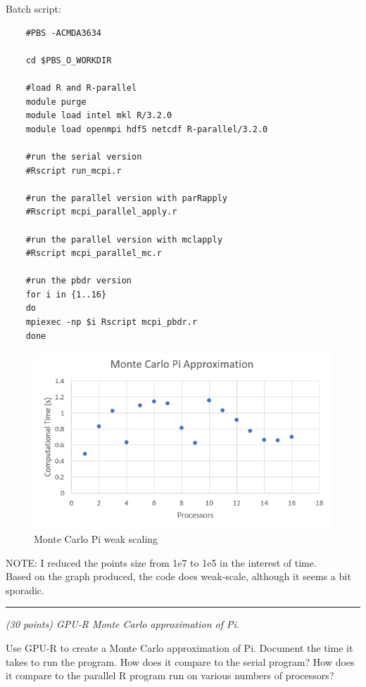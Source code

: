 \documentclass{article}
\newcommand{\myhrule}{ \begin{center}\rule{.9\linewidth}{.25mm}\end{center} }
\newcommand{\pad}{\vspace{8pt}\noindent}
\begin{document}
Batch script:
\begin{verbatim}
    #PBS -ACMDA3634

    cd $PBS_O_WORKDIR
    
    #load R and R-parallel
    module purge
    module load intel mkl R/3.2.0
    module load openmpi hdf5 netcdf R-parallel/3.2.0
    
    #run the serial version
    #Rscript run_mcpi.r
    
    #run the parallel version with parRapply
    #Rscript mcpi_parallel_apply.r
    
    #run the parallel version with mclapply
    #Rscript mcpi_parallel_mc.r
    
    #run the pbdr version
    for i in {1..16}
    do
    mpiexec -np $i Rscript mcpi_pbdr.r
    done
\end{verbatim}

\begin{figure}[!ht]
    \centering
    \includegraphics{monte_carlo_pi_weak.png}
    \caption{Monte Carlo Pi weak scaling}
    \label{fig:my_label}
\end{figure}

NOTE: I reduced the points size from 1e7 to 1e5 in the interest of time. \\

Based on the graph produced, the code does weak-scale, although it seems a bit sporadic.  
\myhrule

\pad {\bf Q5} {\it (30 points) GPU-R Monte Carlo approximation of Pi.}
\vspace{8pt} 

\noindent Use GPU-R to create a Monte Carlo approximation of Pi. Document the time it takes to run the program. How does it compare to the serial program? How does it compare to the parallel R program run on various numbers of processors? \\
\end{document}

